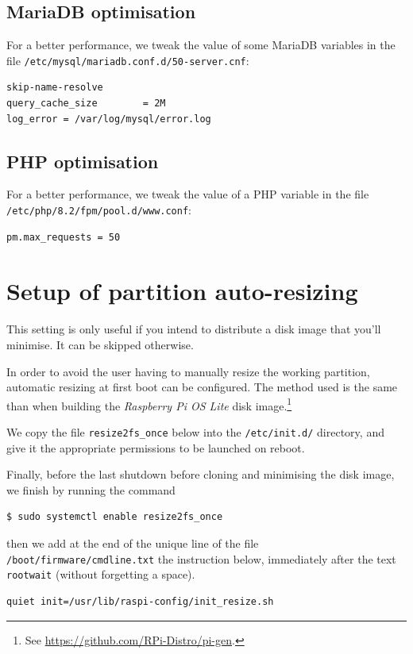 \documentclass[12pt]{article}
\begin{document}
\subsection{MariaDB optimisation}\label{ssec-mariadb-optimisation}

For a better performance, we tweak the value of some MariaDB variables in the file \lstinline{/etc/mysql/mariadb.conf.d/50-server.cnf}:
\begin{lstlisting}[language=bash]
skip-name-resolve
query_cache_size        = 2M
log_error = /var/log/mysql/error.log
\end{lstlisting}

\subsection{PHP optimisation}\label{ssec-php-optimisation}

For a better performance, we tweak the value of a PHP variable in the file \lstinline{/etc/php/8.2/fpm/pool.d/www.conf}:
\begin{lstlisting}[language=bash]
pm.max_requests = 50
\end{lstlisting}

\section{Setup of partition auto-resizing}

This setting is only useful if you intend to distribute a disk image that you'll minimise.
It can be skipped otherwise.

In order to avoid the user having to manually resize the working partition, automatic resizing at first boot can be configured.
The method used is the same than when building the \emph{Raspberry Pi OS Lite} disk image.\footnote{See \url{https://github.com/RPi-Distro/pi-gen}.}

We copy the file \lstinline{resize2fs_once} below into the \lstinline{/etc/init.d/} directory, and give it the appropriate permissions to be launched on reboot.


Finally, before the last shutdown before cloning and minimising the disk image, we finish by running the command
\begin{lstlisting}[language=bash]
$ sudo systemctl enable resize2fs_once
\end{lstlisting}
then we add at the end of the unique line of the file \lstinline{/boot/firmware/cmdline.txt} the instruction below, immediately after the text \lstinline{rootwait} (without forgetting a space).
\begin{lstlisting}[language=bash]
quiet init=/usr/lib/raspi-config/init_resize.sh
\end{lstlisting}
\end{document}
